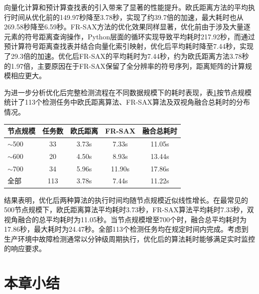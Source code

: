 向量化计算和预计算查找表的引入带来了显著的性能提升。欧氏距离方法的平均执行时间从优化前的149.97秒降至3.78秒，实现了约39.7倍的加速，最大耗时也从269.58秒降至6.59秒。FR-SAX方法的优化效果同样显著，优化前由于涉及大量逐元素的符号距离查询操作，Python层面的循环实现导致平均耗时217.92秒，而通过预计算符号距离查找表并结合向量化索引映射，优化后平均耗时降至7.44秒，实现了29.3倍的加速。优化后FR-SAX的平均耗时为7.44秒，约为欧氏距离方法3.78秒的1.97倍，主要原因在于FR-SAX保留了全分辨率的符号序列，距离矩阵的计算规模相应更大。

为进一步分析优化后完整检测流程在不同数据规模下的耗时表现，表\ref{tab:efficiency_scale}按节点规模统计了113个检测任务中欧氏距离算法、FR-SAX算法及双视角融合总耗时的分布情况。

\begin{table}[htbp]
    \centering
    \label{tab:efficiency_scale}
    \begin{tabular}{lcccc}
        \toprule
        节点规模 & 任务数 & 欧氏距离 & FR-SAX & 融合总耗时 \\
        \midrule
        $\sim$500 & 33 & 3.73s & 7.33s & 11.05s \\
        $\sim$600 & 20 & 4.50s & 8.93s & 13.44s \\
        $\sim$700 & 34 & 5.96s & 11.90s & 17.86s \\
        \midrule
        全部 & 113 & 3.78s & 7.44s & 11.22s \\
        \bottomrule
    \end{tabular}
\end{table}

结果表明，优化后两种算法的执行时间均随节点规模近似线性增长。在最常见的500节点规模下，欧氏距离算法平均耗时3.73秒，FR-SAX算法平均耗时7.33秒，双视角融合的总平均耗时为11.05秒。当节点规模增至700个时，融合总平均耗时为17.86秒，最大耗时为24.47秒。全部113个检测任务均在规定时间内完成。考虑到生产环境中故障检测通常以分钟级周期执行，优化后的算法耗时能够满足实时监控的响应要求。

\section{本章小结}

